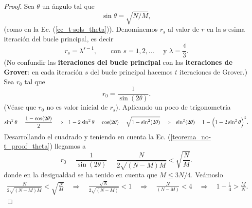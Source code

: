 \documentclass[a4paper,11pt]{book} %
\numberwithin{equation}{chapter}
\def\Lp{\Bigl(}
\def\Rp{\Bigr)}
\def\rqa{\quad \Rightarrow \quad}
\begin{document}
\begin{proof}
Sea $\theta$ un ángulo tal que 
\begin{equation} \label{teorema_no-t_proof_theta}
\sin \theta = \sqrt{N/M},
\end{equation}
(como en la Ec. (\ref{ec_t-sols_theta})). Denominemos $r_s$ al valor de $r$ en la s-esima iteración del bucle principal, es decir
\begin{equation} \label{teorema_no-t_proof_r-s}
r_s = \lambda^{s-1}, \qquad \text{con } s = 1,2,\dots \quad \text{ y } \lambda = \frac{4}{3}.
\end{equation} 
(No confundir las \textbf{iteraciones del bucle principal} con las \textbf{iteraciones de Grover}: en cada iteración $s$ del bucle principal hacemos $t$ iteraciones de Grover.) Sea $r_0$ tal que
\begin{equation}  
r_0 = \frac{1}{\sin (2 \theta)}.
\end{equation}
(Véase que $r_0$ no es valor inicial de $r_s$). Aplicando un poco de trigonometria
\begin{equation*}
\sin^2 \theta =  \frac{1-\cos (2\theta)}{2} 
\,\,\,\, \Rightarrow \,\,\,\, 1 - 2 \sin^2 \theta = \cos (2 \theta) = \sqrt{1 - \sin^2 (2 \theta)} 
\,\,\,\, \Rightarrow \,\,\,\, \sin^2 (2 \theta) = 1 - \Lp 1 - 2 \sin^2 \theta \Rp^2.
\end{equation*}
Desarrollando el cuadrado y teniendo en cuenta la Ec. (\ref{teorema_no-t_proof_theta}) llegamos a
\begin{equation} \label{teorema_no-t_proof_alpha}
r_0 = \frac{1}{\sin (2 \theta)} = \frac{N}{2 \sqrt{(N-M)M}} < \sqrt{\frac{N}{M}}.
\end{equation}
donde en la desigualdad se ha tenido en cuenta que $M \leq 3N/4$. Veámoslo
\begin{align*}
\frac{N}{2 \sqrt{(N-M)M}} < \sqrt{\frac{N}{M}} 
\rqa  \frac{\sqrt{N}}{2 \sqrt{(N-M)}} < 1 
\rqa \frac{N}{(N-M)} < 4 
\rqa  1 - \frac{1}{4} > \frac{M}{N}.
\end{align*}


\end{proof}
\end{document}
